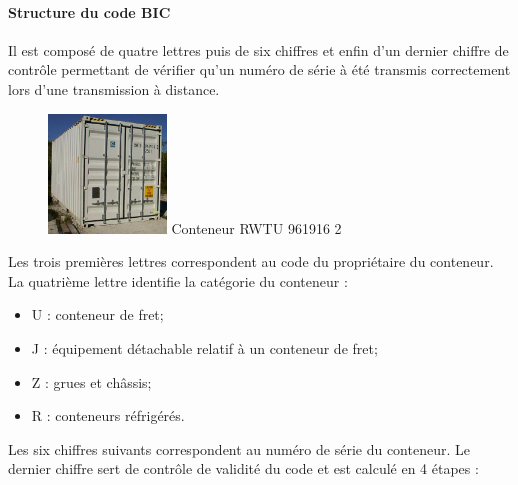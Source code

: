 \paragraph*{Structure du code BIC}
Il est composé de quatre lettres puis de six chiffres et enfin d'un dernier chiffre de contrôle permettant de vérifier qu'un numéro de série à été transmis correctement lors d'une transmission à distance. 

\begin{figure}
 \includegraphics[width=0.28\textwidth]{chapitres/application/BICconteneur.jpg}
 \centering
 \tiny Conteneur RWTU 961916 2 
\end{figure}
Les trois premières lettres correspondent au code du propriétaire du conteneur. La quatrième lettre identifie la catégorie du conteneur : 
\begin{itemize}
 \item U : conteneur de fret;
 \item J : équipement détachable relatif à un conteneur de fret;
 \item Z : grues et châssis;
 \item R : conteneurs réfrigérés.
\end{itemize}

Les six chiffres suivants correspondent au numéro de série du conteneur. Le dernier chiffre sert de contrôle de validité du code et est calculé en 4 étapes : 

